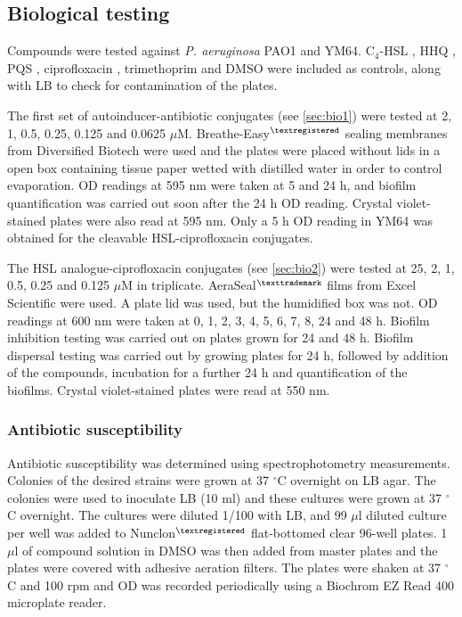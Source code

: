 \subsection{Biological testing\label{sec:exp_bio}}

Compounds were tested against \textit{P. aeruginosa} PAO1\cite{Stover2000} and YM64\cite{Morita2001}.
C$_4$-HSL , HHQ , PQS , ciprofloxacin , trimethoprim  and DMSO were included as controls, along with LB to check for contamination of the plates.

The first set of autoinducer-antibiotic conjugates (see \ref{sec:bio1}) were tested at 2, 1, 0.5, 0.25, 0.125 and 0.0625 $\mu$M. 
Breathe-Easy$^{\tiny{\textregistered}}$ sealing membranes from Diversified Biotech were used and the plates were placed without lids in a open box containing tissue paper wetted with distilled water in order to control evaporation. 
OD readings at 595 nm were taken at 5 and 24 h, and biofilm quantification was carried out soon after the 24 h OD reading. Crystal violet-stained plates were also read at 595 nm.
Only a 5 h OD reading in YM64 was obtained for the cleavable HSL-ciprofloxacin conjugates.

The HSL analogue-ciprofloxacin conjugates (see \ref{sec:bio2}) were tested at 25, 2, 1, 0.5, 0.25 and 0.125 $\mu$M in triplicate.
AeraSeal$^{\tiny{\texttrademark}}$ films from Excel Scientific were used. A plate lid was used, but the humidified box was not.
OD readings at 600 nm were taken at 0, 1, 2, 3, 4, 5, 6, 7, 8, 24 and 48 h. 
Biofilm inhibition testing was carried out on plates grown for 24 and 48 h. Biofilm dispersal testing was carried out by growing plates for 24 h, followed by addition of the compounds, incubation for a further 24 h and quantification of the biofilms. Crystal violet-stained plates were read at 550 nm.

\subsubsection{Antibiotic susceptibility\label{sec:ABsus}}

Antibiotic susceptibility was determined using spectrophotometry measurements.
Colonies of the desired strains were grown at 37 $^{\circ}$C overnight on LB agar.
The colonies were used to inoculate LB (10 ml) and these cultures were grown at 37 $^{\circ}$C overnight. 
The cultures were diluted 1/100 with LB, and 99 $\mu$l diluted culture per well was added to Nunclon$^{\tiny{\textregistered}}$ flat-bottomed clear 96-well plates. 1 $\mu$l of compound solution in DMSO was then added from master plates and the plates were covered with adhesive aeration filters. 
The plates were shaken at 37 $^{\circ}$C and 100 rpm and OD was recorded periodically using a Biochrom EZ Read 400 microplate reader.

